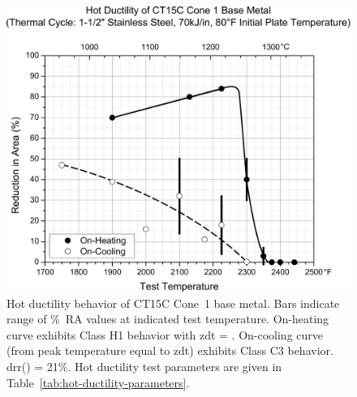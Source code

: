 {\begin{figure}[h!]
    \bigskip
    \bigskip
    \setlength{\abovecaptionskip}{15pt}
    \centering
    \includegraphics[width=6in]{figures/hot-ductility/c1-hot-ductility-curve.pdf}
    \caption[Hot ductility behavior of Cone~1 base metal.]{Hot ductility behavior of CT15C Cone~1 base metal. Bars indicate range of \%~RA values at indicated test temperature. On-heating curve exhibits Class H1 behavior with \gls{zdt} = . On-cooling curve (from peak temperature equal to \gls{zdt}) exhibits Class C3 behavior.  \gls{drr}() = 21\%. Hot ductility test parameters are given in Table~\ref{tab:hot-ductility-parameters}.}
    \label{fig:c1-hot-ductility}
\end{figure}

}

